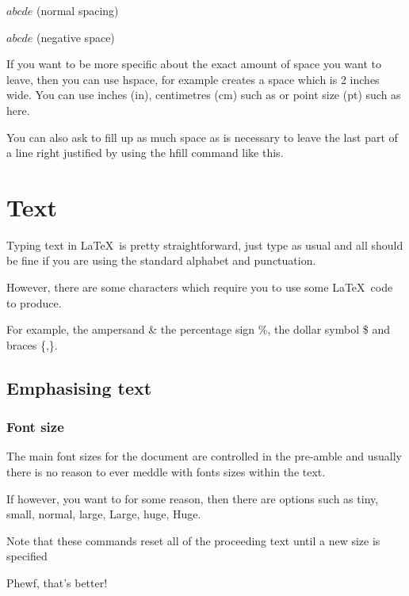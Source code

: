 \documentclass[a4paper,11pt]{article}
\begin{document}
$a b c d e$ (normal spacing)

$a \! b \! c \! d \! e$ (negative space)

If you want to be more specific about the exact amount of space you want to leave, then you can use hspace, for example \hspace{2in} creates a space which is 2 inches wide. You can use inches (in), centimetres (cm) such as \hspace{3cm} or point size (pt) such as \hspace{10pt} here.

You can also ask to fill up as much space as is necessary to leave the last part of a line right justified by using the hfill command  \hfill like this.


\pagebreak

\section{Text}

Typing text in \LaTeX\ is pretty straightforward, just type as usual and all should be fine if you are using the standard alphabet and punctuation.

However, there are some characters which require you to use some \LaTeX\ code to produce.

For example, the ampersand \& the percentage sign \%, the dollar symbol \$ and braces \{,\}.


\subsection{Emphasising text}

\subsubsection{Font size}
The main font sizes for the document are controlled in the pre-amble and usually there is no reason to ever meddle with fonts sizes within the text.

If however, you want to for some reason, then there are options such as \tiny tiny,
\small small,
\normalsize normal,
\large large,
\Large Large,
\huge huge,
\Huge Huge.

Note that these commands reset all of the proceeding text until a new size is specified

\normalsize %
Phewf, that's better!
\end{document}
